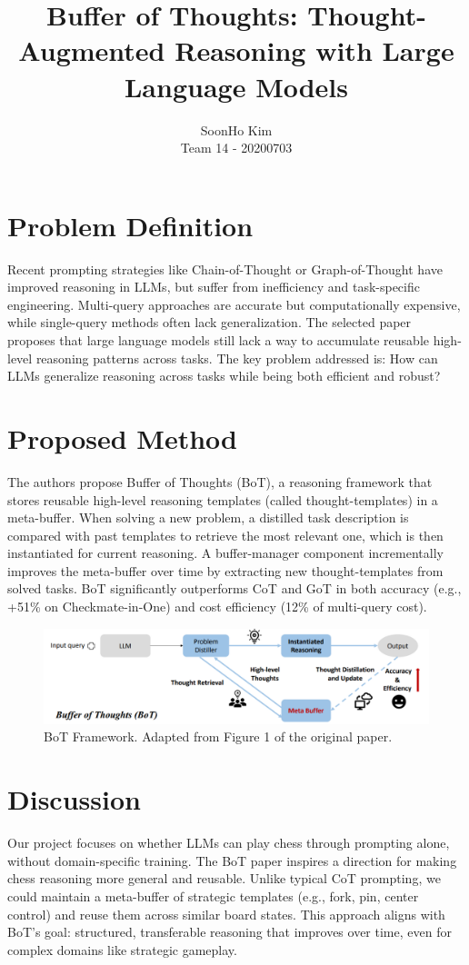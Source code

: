 \documentclass{article}
\title{Buffer of Thoughts: Thought-Augmented Reasoning with Large Language Models}
\author{%
SoonHo Kim \\
Team 14 - 20200703 \\
}
\begin{document}
\maketitle


\section{Problem Definition}
Recent prompting strategies like Chain-of-Thought or Graph-of-Thought have improved reasoning in LLMs, but suffer from inefficiency and task-specific engineering. Multi-query approaches are accurate but computationally expensive, while single-query methods often lack generalization. The selected paper~\cite{yang2024buffer} proposes that large language models still lack a way to accumulate reusable high-level reasoning patterns across tasks. The key problem addressed is: How can LLMs generalize reasoning across tasks while being both efficient and robust?

\section{Proposed Method}
The authors propose Buffer of Thoughts (BoT), a reasoning framework that stores reusable high-level reasoning templates (called thought-templates) in a meta-buffer. When solving a new problem, a distilled task description is compared with past templates to retrieve the most relevant one, which is then instantiated for current reasoning. A buffer-manager component incrementally improves the meta-buffer over time by extracting new thought-templates from solved tasks. BoT significantly outperforms CoT and GoT in both accuracy (e.g., +51\% on Checkmate-in-One) and cost efficiency (12\% of multi-query cost).

\begin{figure}[h]
  \centering
  \includegraphics[width=1.0\linewidth]{figure1.png}
  \caption{BoT Framework. Adapted from Figure 1 of the original paper.}
  \label{fig:bot}
\end{figure}

\section{Discussion}
Our project focuses on whether LLMs can play chess through prompting alone, without domain-specific training. The BoT paper inspires a direction for making chess reasoning more general and reusable. Unlike typical CoT prompting, we could maintain a meta-buffer of strategic templates (e.g., fork, pin, center control) and reuse them across similar board states. This approach aligns with BoT’s goal: structured, transferable reasoning that improves over time, even for complex domains like strategic gameplay.


\newpage


\end{document}

